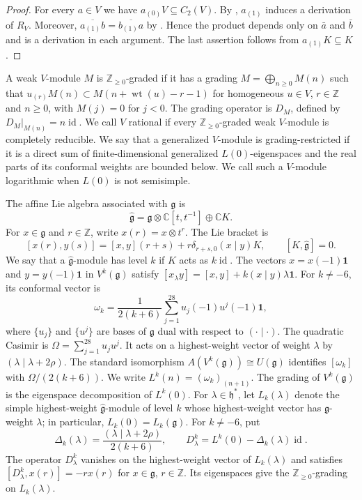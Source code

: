 \documentclass[11pt]{amsart}
\numberwithin{equation}{section}
\theoremstyle{definition}
\theoremstyle{remark}
\newcommand{\CC}{\mathbb C}
\newcommand{\ZZ}{\mathbb Z}
\newcommand{\g}{\mathfrak g}
\newcommand{\h}{\mathfrak h}
\newcommand{\one}{\mathbf1}
\newcommand{\wt}{\operatorname{wt}}
\newcommand{\id}{\operatorname{id}}
\begin{document}
\begin{proof}
For every $a\in V$ we have $a_{(0)}V\subseteq C_2(V)$.
By \cite[Lemma~3.2]{ALY}, $a_{(1)}$ induces a derivation of $R_V$.
Moreover,
$\overline{a_{(1)}b}=\overline{b_{(1)}a}$
by \cite[Lemma~3.1(4)]{ALY}. Hence the product depends only on
$\bar a$ and $\bar b$ and is a derivation in each argument.
The last assertion follows from $a_{(1)}K\subseteq K$.
\end{proof}

A weak $V$-module $M$ is $\mathbb Z_{\geq 0}$-graded if it has a grading
$M=\bigoplus_{n\geq0}M(n)$ such that
$u_{(r)}M(n)\subset M(n+\wt(u)-r-1)$ for homogeneous $u\in V$,
$r\in\ZZ$ and $n\geq0$, with $M(j)=0$ for $j<0$.
The grading operator is $D_M$, defined by $D_M|_{M(n)}=n\id$.
We call $V$ rational if every $\mathbb Z_{\geq 0}$-graded weak $V$-module is completely reducible.
We say that a generalized $V$-module is grading-restricted if it is a
direct sum of finite-dimensional generalized $L(0)$-eigenspaces and
the real parts of its conformal weights are bounded below.
We call such a $V$-module logarithmic when $L(0)$ is not semisimple.

The affine Lie algebra associated with $\g$ is
\[
 \widehat{\g}=\g\otimes\CC[t,t^{-1}]\oplus\CC K.
\]
For $x\in\g$ and $r\in\ZZ$, write $x(r)=x\otimes t^r$. The Lie bracket is
\[
 [x(r),y(s)]=[x,y](r+s)+r\delta_{r+s,0}(x\mid y)K,
 \qquad [K,\widehat{\g}]=0.
\]
We say that a $\widehat{\g}$-module has level $k$ if $K$ acts as
$k\id$.
The vectors $x=x(-1)\one$ and $y=y(-1)\one$ in $V^k(\g)$ satisfy
$[x_\lambda y]=[x,y]+k(x\mid y)\lambda\one$.
For $k\neq-6$, its conformal vector is
\begin{equation}\label{eq:sugawara}
 \omega_k=\frac1{2(k+6)}\sum_{j=1}^{28}u_j(-1)u^j(-1)\one,
\end{equation}
where $\{u_j\}$ and $\{u^j\}$ are bases of $\g$ dual with respect to $(\cdot\mid\cdot)$.
The quadratic Casimir is $\Omega=\sum_{j=1}^{28}u_ju^j$.
It acts on a highest-weight vector of weight $\lambda$ by
$(\lambda\mid\lambda+2\rho)$.
The standard isomorphism $A(V^k(\g))\cong U(\g)$ \cite{FZ} identifies
$[\omega_k]$ with $\Omega/(2(k+6))$.
We write $L^k(n)=(\omega_k)_{(n+1)}$. The grading of $V^k(\g)$
is the eigenspace decomposition of $L^k(0)$.
For $\lambda\in\h^*$, let $L_k(\lambda)$ denote the simple
highest-weight $\widehat{\g}$-module of level $k$ whose highest-weight
vector has $\g$-weight $\lambda$; in particular, $L_k(0)=L_k(\g)$.
For $k\neq-6$, put
\[
 \Delta_k(\lambda)=\frac{(\lambda\mid\lambda+2\rho)}{2(k+6)},
 \qquad
 D^k_\lambda=L^k(0)-\Delta_k(\lambda)\id.
\]
The operator $D^k_\lambda$ vanishes on the highest-weight vector of
$L_k(\lambda)$ and satisfies $[D^k_\lambda,x(r)]=-r x(r)$ for
$x\in\g$, $r\in\ZZ$. Its eigenspaces give the $\ZZ_{\geq0}$-grading on
$L_k(\lambda)$.
\end{document}
